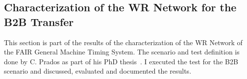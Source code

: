 %
%

\subsection{Characterization of the WR Network for the B2B Transfer}
\label{wr_network}
This section is part of the results of the characterization of the WR Network of the FAIR General Machine Timing System. The scenario and test definition is done by C. Prados as part of his PhD thesis~\cite{prados_notitle_nodate}. I executed the test for the B2B scenario and discussed, evaluated and documented the results. 

